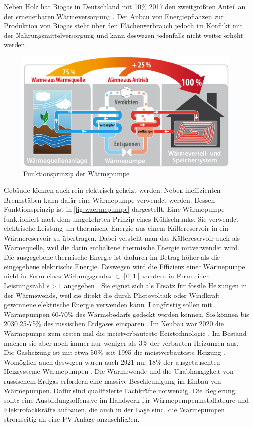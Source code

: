 Neben Holz hat Biogas in Deutschland mit 10\% 2017 den zweitgrößten Anteil an der erneuerbaren Wärmeversorgung \cite{ei1}. Der Anbau von Energiepflanzen zur Produktion von Biogas steht über den Flächenverbrauch jedoch im Konflikt mit der Nahrungsmittelversorgung und kann deswegen jedenfalls nicht weiter erhöht werden.

\begin{figure}[h]
\centering
\includegraphics[width=12cm]{../fig/waermepumpe.png}
\caption{Funktionsprinzip der Wärmepumpe \cite{ei1}}
\label{fig:waermepumpe}
\end{figure}

Gebäude können auch rein elektrisch geheizt werden. Neben ineffizienten Brennstäben kann dafür eine Wärmepumpe verwendet werden. Dessen Funktionsprinzip ist in \autoref{fig:waermepumpe} dargestellt. Eine Wärmepumpe funktioniert nach dem umgekehrten Prinzip eines Kühlschranks. Sie verwendet elektrische Leistung um thermische Energie aus einem Kältereservoir in ein Wärmereservoir zu übertragen. Dabei versteht man das Kältereservoir auch als Wärmequelle, weil die darin enthaltene thermische Energie mitverwendet wird. Die ausgegebene thermische Energie ist dadurch im Betrag höher als die eingegebene elektrische Energie. Deswegen wird die Effizienz einer Wärmepumpe nicht in Form eines Wirkungsgrades $\in [0,1]$ sondern in Form einer Leistungszahl $\epsilon > 1$ angegeben \cite{ei1}. Sie eignet sich als Ersatz für fossile Heizungen in der Wärmewende, weil sie direkt die durch Photovoltaik oder Windkraft gewonnene elektrische Energie verwenden kann. Langfristig sollen mit Wärmepumpen 60-70\% des Wärmebedarfs gedeckt werden können. Sie können bis 2030 25-75\% des russischen Erdgases einsparen \cite{clausen2022}. Im Neubau war 2020 die Wärmepumpe zum ersten mal die meistverbauteste Heiztechnologie \cite{statista-neubau-heizung}. Im Bestand machen sie aber noch immer nur weniger als 3\% der verbauten Heizungen aus. Die Gasheizung ist mit etwa 50\% seit 1995 die meistverbauteste Heizung \cite{statista-bestand-heizung}. Womöglich auch deswegen waren auch 2021 nur 18\% der ausgetauschten Heizsysteme Wärmepumpen \cite{clausen2022}. 
Die Wärmewende und die Unabhängigkeit von russischem Erdgas erfordern eine massive Beschleunigung im Einbau von Wärmepumpen. Dafür sind qualifizierte Fachkräfte notwendig. Die Regierung sollte eine Ausbildungsoffensive im Handwerk für Wärmepumpeninstallateure und Elektrofachkräfte aufbauen, die auch in der Lage sind, die Wärmepumpen stromseitig an eine PV-Anlage anzuschließen. 

